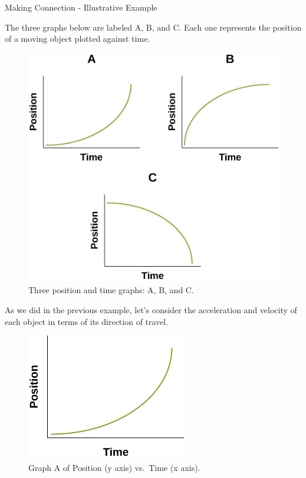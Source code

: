 \documentclass[
]{book}
\newenvironment{note}{}{}
\begin{document}
\hypertarget{fs-id1050890}{}
\begin{note}

Making Connection - Illustrative Example

The three graphs below are labeled A, B, and C. Each one represents the
position of a moving object plotted against time.

\begin{figure}
\hypertarget{fs-id2024196}{%
\centering
\includegraphics{images/CNX_APPhysics_02_M4_graphoverv.jpg}
\caption{Three position and time graphs: A, B, and
C.}\label{fs-id2024196}
}
\end{figure}

As we did in the previous example, let's consider the acceleration and
velocity of each object in terms of its direction of travel.

\begin{figure}
\hypertarget{fs-id2217910}{%
\centering
\includegraphics{images/Figure_Ch2_M4_08.jpg}
\caption{Graph A of Position (y axis) vs.~Time (x
axis).}\label{fs-id2217910}
}
\end{figure}


\end{note}
\end{document}
